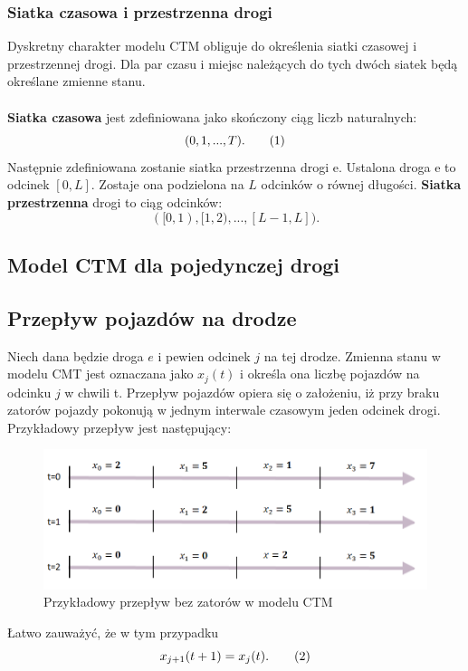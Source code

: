 \documentclass[12pt]{book}
\theoremstyle{plain}
\newcommand\addtag{\refstepcounter{equation}
\renewcommand{\labelenumii}{\theenumii}
\renewcommand{\theenumii}{\theenumi.\arabic{enumii}.}
\tag{\theequation}}
\begin{document}
\subsubsection*{Siatka czasowa i przestrzenna drogi}
Dyskretny charakter modelu CTM obliguje do określenia siatki czasowej i przestrzennej drogi. Dla par czasu i miejsc należących do tych dwóch siatek będą określane zmienne stanu. \\ \\ \textbf{Siatka czasowa} jest zdefiniowana jako skończony ciąg liczb naturalnych:
\[(0,1,...,T). \addtag \]
Następnie zdefiniowana zostanie siatka przestrzenna drogi e. Ustalona droga e to odcinek $[0,L]$. Zostaje ona podzielona na $L$ odcinków o równej długości. \textbf{Siatka przestrzenna} drogi to ciąg odcinków:
\[([0,1),[1,2),...,[L-1,L] ).\]

\subsection{Model CTM dla pojedynczej drogi}
\subsection*{Przepływ pojazdów na drodze}
Niech dana będzie droga $e$ i pewien odcinek $j$ na tej drodze. Zmienna stanu w modelu CMT jest oznaczana jako $x_j(t)$ i określa ona liczbę pojazdów na odcinku $j$ w chwili t.
Przepływ pojazdów opiera się o założeniu, iż przy braku zatorów pojazdy pokonują w jednym interwale czasowym jeden odcinek drogi. Przykładowy przepływ jest następujący:
\begin{figure}[H]
	\centering
	\includegraphics[width=14cm]{images/CTM_flow_example}
	\caption{Przykładowy przepływ bez zatorów w modelu CTM}
	\label{fig:CTM_flow_example}
\end{figure} \noindent
Łatwo zauważyć, że w tym przypadku
\[ x_{j+1}(t+1)=x_j(t). \addtag \]
\end{document}
